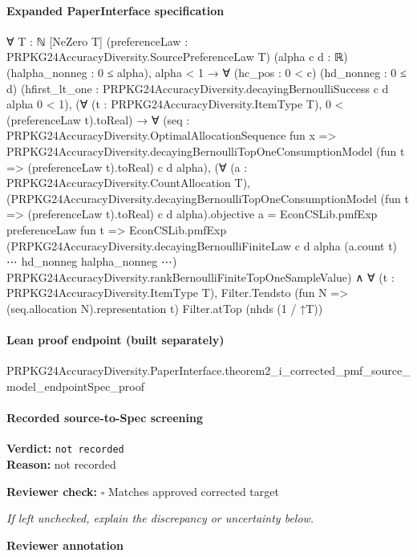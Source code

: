 \documentclass[10pt]{article}
\newcommand{\reviewerbox}{%
  \par\noindent\fbox{\parbox{0.96\linewidth}{\rule{0pt}{0.38in}}}\par
}
\newcommand{\reviewmatch}[1]{%
  \par\noindent\textbf{Reviewer check:} $\square$\; #1\par
  \noindent\emph{If left unchecked, explain the discrepancy or uncertainty below.}\par
}
\begin{document}
\paragraph{Expanded PaperInterface specification}
\begin{ReviewVerbatim}
∀ {T : ℕ} [NeZero T] (preferenceLaw : PRPKG24AccuracyDiversity.SourcePreferenceLaw T) (alpha c d : ℝ)
  (halpha_nonneg : 0 ≤ alpha),
  alpha < 1 →
    ∀ (hc_pos : 0 < c) (hd_nonneg : 0 ≤ d)
      (hfirst_lt_one : PRPKG24AccuracyDiversity.decayingBernoulliSuccess c d alpha 0 < 1),
      (∀ (t : PRPKG24AccuracyDiversity.ItemType T), 0 < (preferenceLaw t).toReal) →
        ∀
          (seq :
            PRPKG24AccuracyDiversity.OptimalAllocationSequence fun x =>
              PRPKG24AccuracyDiversity.decayingBernoulliTopOneConsumptionModel (fun t => (preferenceLaw t).toReal) c d
                alpha),
          (∀ (a : PRPKG24AccuracyDiversity.CountAllocation T),
              (PRPKG24AccuracyDiversity.decayingBernoulliTopOneConsumptionModel (fun t => (preferenceLaw t).toReal) c d
                      alpha).objective
                  a =
                EconCSLib.pmfExp preferenceLaw fun t =>
                  EconCSLib.pmfExp
                    (PRPKG24AccuracyDiversity.decayingBernoulliFiniteLaw c d alpha (a.count t) ⋯ hd_nonneg halpha_nonneg
                      ⋯)
                    PRPKG24AccuracyDiversity.rankBernoulliFiniteTopOneSampleValue) ∧
            ∀ (t : PRPKG24AccuracyDiversity.ItemType T),
              Filter.Tendsto (fun N => (seq.allocation N).representation t) Filter.atTop (nhds (1 / ↑T))
\end{ReviewVerbatim}

\paragraph{Lean proof endpoint (built separately)}\begin{ReviewVerbatim}
PRPKG24AccuracyDiversity.PaperInterface.theorem2_i_corrected_pmf_source_model_endpointSpec_proof
\end{ReviewVerbatim}

\paragraph{Recorded source-to-Spec screening}
\textbf{Verdict:} \texttt{not recorded}
\\
\textbf{Reason:} not recorded
\reviewmatch{Matches approved corrected target}
\noindent\textbf{Reviewer annotation}\par
\reviewerbox
\clearpage
\hypertarget{source-claim-6ff5481408fce970}{}
\end{document}
